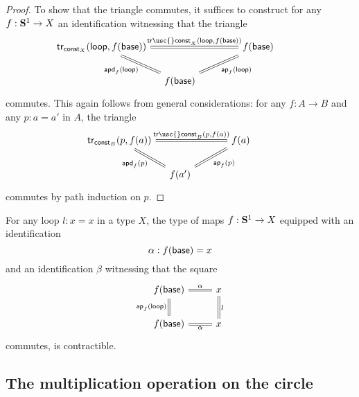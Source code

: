 \begin{proof}
  To show that the triangle commutes, it suffices to construct for any $f:\mathbf{S}^{1}\to X$ an identification witnessing that the triangle
  \begin{equation*}
    \begin{tikzcd}[column sep=1em]
      \tr_{\const_X}(\lloop,f(\base)) \arrow[dr,equals,swap,"\apd{f}{\lloop}"] \arrow[rr,equals,"{\mathsf{tr\usc{}const}_X(\lloop,f(\base))}"] & & f(\base) \arrow[dl,equals,"\ap{f}{\lloop}"] \\
      & f(\base) & \phantom{\tr_{\const_X}(\lloop,f(\base))}
    \end{tikzcd}
  \end{equation*}
  commutes. This again follows from general considerations: for any $f:A\to B$ and any $p:a=a'$ in $A$, the triangle
  \begin{equation*}
    \begin{tikzcd}[column sep=1em]
      \tr_{\const_B}(p,f(a)) \arrow[dr,equals,swap,"\apd{f}{p}"] \arrow[rr,equals,"{\mathsf{tr\usc{}const}_B(p,f(a))}"] & & f(a) \arrow[dl,equals,"\ap{f}{p}"] \\
      & f(a') & \phantom{\tr_{\const_B}(p,f(a))}
    \end{tikzcd}
  \end{equation*}
  commutes by path induction on $p$.
\end{proof}

\begin{cor}
  For any loop $l:x=x$ in a type $X$, the type of maps $f:\mathbf{S}^{1}\to X$ equipped with an identification
  \begin{equation*}
    \alpha : f(\mathsf{base})=x 
  \end{equation*}
  and an identification $\beta$ witnessing that the square
  \begin{equation*}
    \begin{tikzcd}
      f(\base) \arrow[r,equals,"\alpha"] \arrow[d,equals,swap,"\ap{f}{\lloop}"] & x \arrow[d,equals,"l"] \\
      f(\base) \arrow[r,equals,swap,"\alpha"] & x
    \end{tikzcd}
  \end{equation*}
  commutes, is contractible.
\end{cor}

\subsection{The multiplication operation on the circle}

